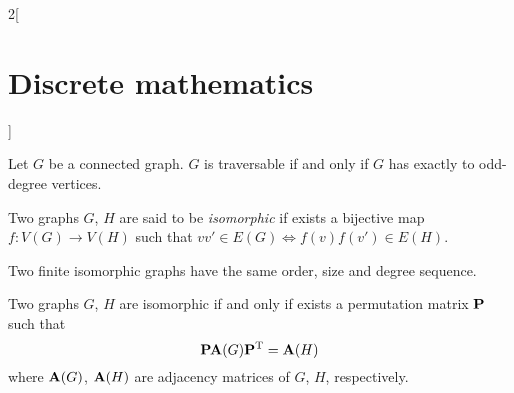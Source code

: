 \documentclass[../../../main.tex]{subfiles}
\begin{document}
\begin{multicols}{2}[\section{Discrete mathematics}]
\begin{definition}
    \end{definition}
    \begin{theorem}
        Let $G$ be a connected graph. $G$ is traversable if and only if $G$ has exactly to odd-degree vertices.
    \end{theorem}
    \begin{definition}
        Two graphs $G$, $H$ are said to be \textit{isomorphic} if exists a bijective map $f:V(G)\rightarrow V(H)$ such that $vv'\in E(G)\iff f(v)f(v')\in E(H)$.
    \end{definition}
    \begin{prop}
        Two finite isomorphic graphs have the same order, size and degree sequence.
    \end{prop}
    \begin{theorem}
        Two graphs $G$, $H$ are isomorphic if and only if exists a permutation matrix $\vb{P}$ such that $$\vb{P}\vb{A}(G)\vb{P}^{\mathrm{T}}=\vb{A}(H)$$ where $\vb{A}(G)$, $\vb{A}(H)$ are adjacency matrices of $G$, $H$, respectively.
    \end{theorem}

\end{multicols}
\end{document}
